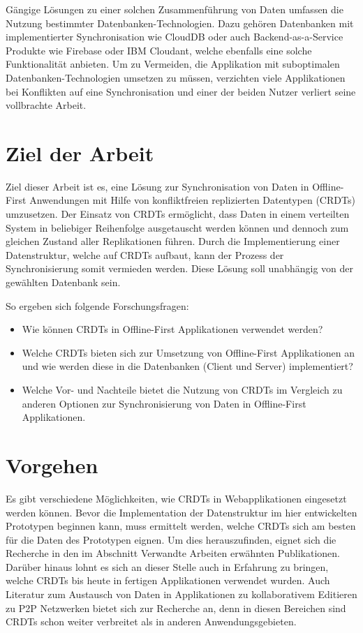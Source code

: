 \documentclass[a4paper, 12pt]{scrreprt}
\begin{document}
Gängige Lösungen zu einer solchen Zusammenführung von Daten umfassen die Nutzung bestimmter Datenbanken-Technologien. Dazu gehören Datenbanken mit implementierter Synchronisation wie CloudDB oder auch Backend-as-a-Service Produkte wie Firebase oder IBM Cloudant, welche ebenfalls eine solche Funktionalität anbieten. Um zu Vermeiden, die Applikation mit suboptimalen Datenbanken-Technologien umsetzen zu müssen, verzichten viele Applikationen bei Konflikten auf eine Synchronisation und einer der beiden Nutzer verliert seine vollbrachte Arbeit.

\section{Ziel der Arbeit} 

Ziel dieser Arbeit ist es, eine Lösung zur Synchronisation von Daten in Offline-First Anwendungen mit Hilfe von konfliktfreien replizierten Datentypen (CRDTs) umzusetzen. Der Einsatz von CRDTs ermöglicht, dass Daten in einem verteilten System in beliebiger Reihenfolge ausgetauscht werden können und dennoch zum gleichen Zustand aller Replikationen führen. Durch die Implementierung einer Datenstruktur, welche auf CRDTs aufbaut, kann der Prozess der Synchronisierung somit vermieden werden. Diese Lösung soll unabhängig von der gewählten Datenbank sein.

So ergeben sich folgende Forschungsfragen:

\begin{itemize}
	\item Wie können CRDTs in Offline-First Applikationen verwendet werden?
	\item Welche CRDTs bieten sich zur Umsetzung von Offline-First Applikationen an und wie werden diese in die Datenbanken (Client und Server) implementiert?
	\item Welche Vor- und Nachteile bietet die Nutzung von CRDTs im Vergleich zu anderen Optionen zur Synchronisierung von Daten in Offline-First Applikationen.
\end{itemize}

\section{Vorgehen}
Es gibt verschiedene Möglichkeiten, wie CRDTs in Webapplikationen eingesetzt werden können. Bevor die Implementation der Datenstruktur im hier entwickelten Prototypen beginnen kann, muss ermittelt werden, welche CRDTs sich am besten für die Daten des Prototypen eignen. Um dies herauszufinden, eignet sich die Recherche in den im Abschnitt Verwandte Arbeiten erwähnten Publikationen. Darüber hinaus lohnt es sich an dieser Stelle auch in Erfahrung zu bringen, welche CRDTs bis heute in fertigen Applikationen verwendet wurden. Auch Literatur zum Austausch von Daten in Applikationen zu kollaborativem Editieren zu \ac{P2P} Netzwerken bietet sich zur Recherche an, denn in diesen Bereichen sind CRDTs schon weiter verbreitet als in anderen Anwendungsgebieten.
\end{document}
